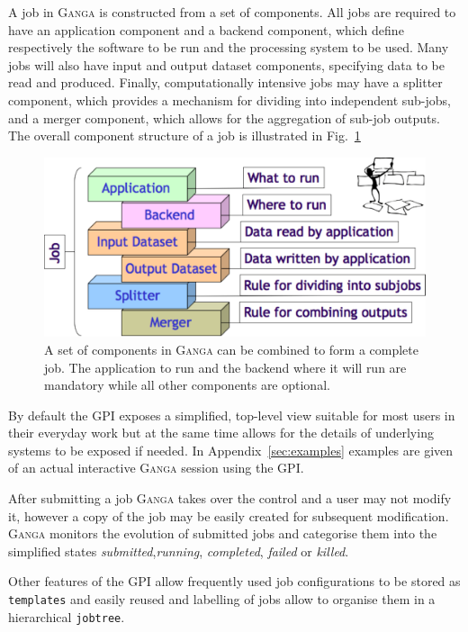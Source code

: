 \documentclass{elsart}
\def\ganga {\textsc{Ganga}\xspace}
\def\GPI{GPI\xspace}
\newcommand{\code}[1]{\texttt{#1}}
\newcommand{\val}[1]{\emph{#1}}
\begin{document}
A job in \ganga is constructed from a set of components. All jobs are
required to have an application component and a backend component, which
define respectively the software to be run and the processing system to be
used.  Many jobs will also have input and output dataset components,
specifying data to be read and produced.  Finally, computationally intensive
jobs may have a splitter component, which provides a mechanism for dividing
into independent sub-jobs, and a merger component, which allows for the
aggregation of sub-job outputs. The overall component structure of a job is
illustrated in Fig.~\ref{fig:JobComponents}
\begin{figure}
  \centering
  \includegraphics[width=14cm]{GangaJob.pdf}
  \caption{A set of components in \ganga can be combined to form a complete
    job. The application to run and the backend where it will run are
    mandatory while all other components are optional.}
  \label{fig:JobComponents}
\end{figure}

By default the \GPI exposes a simplified, top-level view suitable for most
users in their everyday work but at the same time allows for the details of
underlying systems to be exposed if needed. In Appendix~\ref{sec:examples}
examples are given of an actual interactive \ganga session using the \GPI.

After submitting a job \ganga takes over the control and a user may not modify
it, however a copy of the job may be easily created for subsequent
modification. \ganga monitors the evolution of submitted jobs and categorise
them into the simplified states \val{submitted},\val{running},
\val{completed}, \val{failed} or \val{killed}.

Other features of the \GPI allow frequently used job configurations to be
stored as \code{templates} and easily reused and labelling of jobs allow to
organise them in a hierarchical \code{jobtree}.
\end{document}
